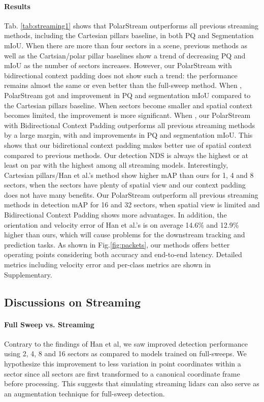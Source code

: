 \documentclass{article}
\begin{document}
\paragraph{Results} Tab. \ref{tab:streaming1} shows that PolarStream outperforms all previous streaming methods, including the Cartesian pillars baseline, in both PQ and Segmentation mIoU. When there are more than four sectors in a scene, previous methods as well as the Cartsian/polar pillar baselines show a trend of decreasing PQ and mIoU as the number of sectors increases. However, our PolarStream with bidirectional context padding does not show such a trend: the performance remains almost the same or even better than the full-sweep method. When , PolarStream got  and  improvement in PQ and segmentation mIoU compared to the Cartesian pillars baseline. When sectors become smaller and spatial context becomes limited, the improvement is more significant. When , our PolarStream with Bidirectional Context Padding outperforms all previous streaming methods by a large margin, with  and  improvements in PQ and segmentation mIoU. This shows that our bidiretional context padding makes better use of spatial context compared to previous methods. Our detection NDS is always the highest or at least on par with the highest among all streaming models. Interestingly, Cartesian pillars/Han et al.'s method show higher mAP than ours for 1, 4 and 8 sectors, when the sectors have plenty of spatial view and our context padding does not have many benefits. Our PolarStream outperform all previous streaming methods in detection mAP for 16 and 32 sectors, when spatial view is limited and Bidirectional Context Padding shows more advantages. In addition, the orientation and velocity error of Han et al.'s is on average 14.6\% and 12.9\% higher than ours, which will cause problems for the downstream tracking and prediction tasks. As shown in Fig.\ref{fig:packets}, our methods offers better operating points considering both accuracy and end-to-end latency. Detailed metrics including velocity error and per-class metrics are shown in Supplementary.



\subsection{Discussions on Streaming}
\paragraph{Full Sweep vs. Streaming}
Contrary to the findings of Han et al\cite{han2020streaming}, we saw improved detection performance using 2, 4, 8 and 16 sectors as compared to models trained on full-sweeps. We hypothesize this improvement to less variation in point coordinates within a sector since all sectors are first transformed to a canonical coordinate frame before processing. This suggests that simulating streaming lidars can also serve as an augmentation technique for full-sweep detection.
\end{document}
